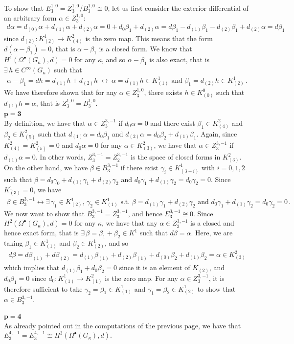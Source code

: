 \documentclass[10pt]{amsart}
\theoremstyle{remark}
\numberwithin{equation}{section}
\begin{document}
To show that $E^{1,0}_3=Z_3^{1,0}/B_3^{1,0}\cong 0$, let us first consider the exterior differential of an arbitrary form $\alpha\in Z_3^{1,0}$:
\begin{align*}
    d\alpha=d_{(0)}\alpha+d_{(1)}\alpha+d_{(2)}\alpha=0+d_0\beta_1+d_{(2)}\alpha=d\beta_1-d_{(1)}\beta_1-d_{(2)}\beta_1+d_{(2)}\alpha=d\beta_1
\end{align*}
since $d_{(2)}\colon K_{(2)}^1\to K_{(4)}^2$ is the zero map. This means that the form $d(\alpha-\beta_1)=0$, that is $\alpha-\beta_1$ is a closed form. We know that $H^1(\Omega^\bullet(G_\kappa),d)=0$ for any $\kappa$, and so $\alpha-\beta_1$ is also exact, that is $\exists\, h\in C^\infty(G_\kappa)$ such that
\begin{align*}
    \alpha-\beta_1=dh=d_{(1)}h+d_{(2)}h\ \longleftrightarrow \ \alpha=d_{(1)}h\in K_{(1)}^1\text{ and }\beta_1=d_{(2)}h\in K_{(2)}^1\,.
\end{align*}
We have therefore shown that for any $\alpha\in Z_3^{1,0}$, there exists $h\in K_{(0)}^0$ such that $d_{(1)}h=\alpha$, that is $Z_3^{1,0}=B_3^{1,0}$.\\
$\mathbf{p=3}$\\
By definition, we have that $\alpha\in Z_3^{3,-1}$ if $d_0\alpha=0$ and there exist $\beta_1\in K_{(4)}^2$ and $\beta_2\in K_{(5)}^2$ such that $d_{(1)}\alpha=d_0\beta_1$ and $d_{(2)}\alpha=d_0\beta_2+d_{(1)}\beta_1$. Again, since $K_{(4)}^2=K_{(5)}^2=0$ and $d_0\alpha=0$ for any $\alpha\in K_{(3)}^2$, we have that $\alpha\in Z_3^{3,-1}$ if $d_{(1)}\alpha=0$. In other words, $Z^{3,-1}_3=Z^{3,-1}_2$ is the space of closed forms in $K_{(3)}^2$. On the other hand, we have $\beta\in B^{3,-1}_3$ if there exist $\gamma_i\in K_{(3-i)}^1$ with $i=0,1,2$ such that $\beta=d_0\gamma_0+d_{(1)}\gamma_1+d_{(2)}\gamma_2$ and $d_0\gamma_1+d_{(1)}\gamma_2=d_0\gamma_2=0$. Since $K_{(3)}^1=0$, we have
\begin{align*}
    \beta\in B^{3,-1}_3\longleftrightarrow \exists\,\gamma_1\in K_{(2)}^1,\,\gamma_2\in K_{(1)}^1\text{ s.t. } \beta = d_{(1)}\gamma_1+d_{(2)}\gamma_{2}\text{ and }d_0\gamma_1+d_{(1)}\gamma_2=d_0\gamma_2=0\,.
\end{align*}We now want to show that $B_3^{3,-1}=Z_3^{3,-1}$, and hence $E^{3,-1}_3\cong 0$. Since $H^2(\Omega^\bullet(G_\kappa),d)=0$ for any $\kappa$, we have that any $\alpha\in Z_3^{3,-1}$ is a closed and hence exact form, that is $\exists\,\beta=\beta_1+\beta_2\in K^1$ such that $d\beta=\alpha$. Here, we are taking $\beta_1\in K_{(1)}^1$ and $\beta_2\in K_{(2)}^1$, and so
\begin{align*}
    d\beta=d\beta_{(1)}+d\beta_{(2)}=d_{(1)}\beta_{(1)}+d_{(2)}\beta_{(1)}+d_{(0)}\beta_2+d_{(1)}\beta_2=\alpha\in K_{(3)}^2
\end{align*}
which implies that $d_{(1)}\beta_1+d_{0}\beta_2=0$ since it is an element of $ K_{(2)}$, and $d_0\beta_1=0$ since $d_0\colon K_{(1)}^1\to K_{(1)}^2$ is the zero map.
For any $\alpha\in Z_3^{3,-1}$, it is therefore sufficient to take $\gamma_2=\beta_1\in K_{(1)}^1$ and $\gamma_{1}=\beta_2\in K_{(2)}^1$ to show that $\alpha\in B^{3,-1}_3$.

$\mathbf{p=4}$\\
As already pointed out in the computations of the previous page, we have that $E_3^{4,-1}=E_3^{4,-1}\cong H^3(\Omega^\bullet(G_\kappa),d)$.






\end{document}
